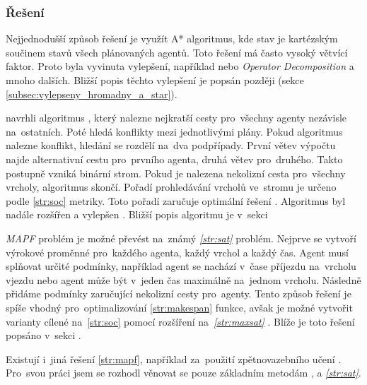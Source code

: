 \subsubsection{Řešení~}\label{subsubsec:reseni_offline_mapf}



Nejjednodušší způsob řešení je využít A* algoritmus, kde stav je kartézským součinem stavů všech plánovaných agentů.
Toto řešení má často vysoký větvící faktor.
Proto byla vyvinuta vylepšení, například  nebo
\emph{Operator Decomposition} \citep{Standley_2010} a mnoho dalších.
Bližší popis těchto vylepšení je popsán později (sekce \ref{subsec:vylepseny_hromadny_a_star}).

\citet*{Sharon} navrhli algoritmus ,
který nalezne nejkratší cesty pro~všechny agenty nezávisle na~ostatních.
Poté hledá konflikty mezi jednotlivými plány.
Pokud algoritmus nalezne konflikt, hledání se rozdělí na~dva podpřípady.
První větev výpočtu najde alternativní cestu pro~prvního agenta, druhá větev pro~druhého.
Takto postupně vzniká binární strom.
Pokud je nalezena nekolizní cesta pro~všechny vrcholy, algoritmus skončí.
Pořadí prohledávání vrcholů ve~stromu je určeno podle \ref{str:soc} metriky.
Toto pořadí zaručuje optimální řešení \citep{Sharon}.
Algoritmus byl nadále rozšířen a vylepšen \citep{Boyarski}.
Bližší popis algoritmu je v~sekci 

\emph{MAPF} problém je možné převést na~známý \emph{\ref{str:sat}} problém.
Nejprve se vytvoří výrokové proměnné pro~každého agenta, každý vrchol a každý čas.
Agent musí splňovat určité podmínky, například agent se nachází v~čase příjezdu na~vrcholu vjezdu
nebo agent může být v~jeden čas maximálně na~jednom vrcholu.
Následně přidáme podmínky zaručující nekolizní cesty pro~agenty.
Tento způsob řešení je spíše vhodný pro~optimalizování \ref{str:makespan} funkce,
avšak je možné vytvořit varianty cílené na~\ref{str:soc} pomocí rozšíření na~\emph{\ref{str:maxsat}} \citep{bartak}.
Blíže je toto řešení popsáno v~sekci .

Existují i~jiná řešení \ref{str:mapf}, například za~použití zpětnovazebního učení \citep*{Zhiyao}.
Pro~svou práci jsem se rozhodl věnovat se pouze základním metodám
,  a \emph{\ref{str:sat}}.

